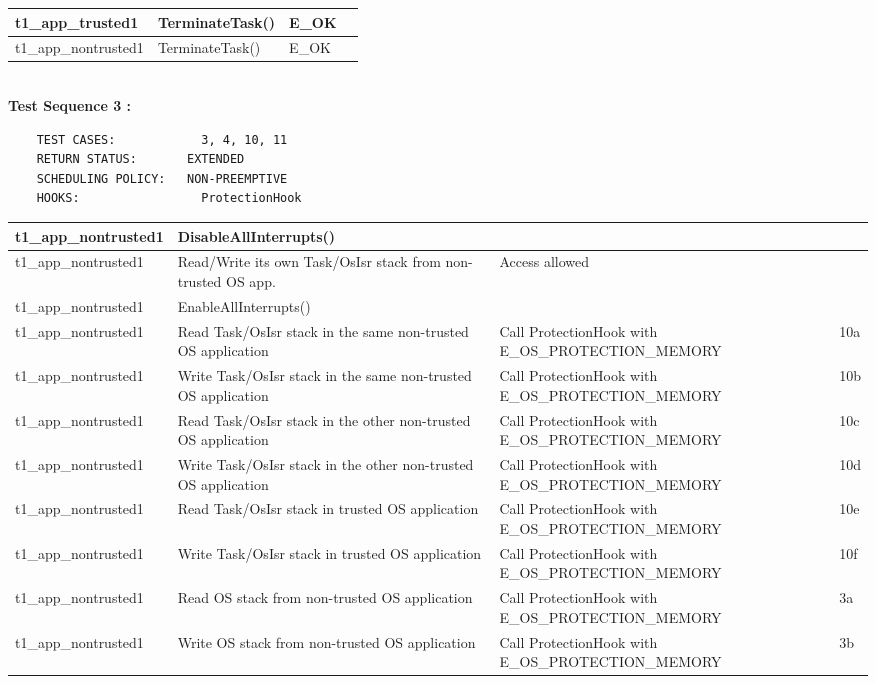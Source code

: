 \documentclass[10pt]{article}
\newlength{\Li}\settowidth{\Li}{Running}
\newlength{\Lii}\setlength{\Lii}{7cm}
\newlength{\Liiii}\setlength{\Liiii}{0.9cm}
\newlength{\Liii}\setlength{\Liii}{\textwidth} \addtolength{\Liii}{-\Li} \addtolength{\Liii}{-\Lii} \addtolength{\Liii}{-\Liiii}
\begin{document}
\begin{supertabular}{|p{\Li}|p{\Lii}|p{\Liii}|p{\Liiii}|}
	t1\_app\_trusted1		& TerminateTask()										& E\_OK											& \\ \hline
	t1\_app\_nontrusted1	& TerminateTask()										& E\_OK											& \\ \hline
	\end{supertabular}\\

	\textbf{Test Sequence 3 :}
	\begin{lstlisting}
	TEST CASES:		       3, 4, 10, 11
	RETURN STATUS:	  	 EXTENDED
	SCHEDULING POLICY:   NON-PREEMPTIVE
	HOOKS:		           ProtectionHook
	\end{lstlisting}
	

	\begin{supertabular}{|p{\Li}|p{\Lii}|p{\Liii}|p{\Liiii}|} \hline 
	t1\_app\_nontrusted1	& DisableAllInterrupts()								&												& \\ \hline
	t1\_app\_nontrusted1	& Read/Write its own Task/OsIsr stack from non-trusted OS app.	& Access allowed								& \\ \hline
	t1\_app\_nontrusted1	& EnableAllInterrupts()								&												& \\ \hline
	
	t1\_app\_nontrusted1	& Read Task/OsIsr stack in the same non-trusted OS application 	& Call ProtectionHook with E\_OS\_PROTECTION\_MEMORY		& 10a \\ \hline
	t1\_app\_nontrusted1	& Write Task/OsIsr stack in the same non-trusted OS application 	& Call ProtectionHook with E\_OS\_PROTECTION\_MEMORY		& 10b \\ \hline
	t1\_app\_nontrusted1	& Read Task/OsIsr stack in the other non-trusted OS application 	& Call ProtectionHook with E\_OS\_PROTECTION\_MEMORY		& 10c \\ \hline
	t1\_app\_nontrusted1	& Write Task/OsIsr stack in the other non-trusted OS application 	& Call ProtectionHook with E\_OS\_PROTECTION\_MEMORY		& 10d \\ \hline
	t1\_app\_nontrusted1	& Read Task/OsIsr stack in trusted OS application			 	& Call ProtectionHook with E\_OS\_PROTECTION\_MEMORY		& 10e \\ \hline
	t1\_app\_nontrusted1	& Write Task/OsIsr stack in trusted OS application			 	& Call ProtectionHook with E\_OS\_PROTECTION\_MEMORY		& 10f \\ \hline
	t1\_app\_nontrusted1	& Read OS stack from non-trusted OS application				& Call ProtectionHook with E\_OS\_PROTECTION\_MEMORY		& 3a \\ \hline
	t1\_app\_nontrusted1	& Write OS stack from non-trusted OS application				& Call ProtectionHook with E\_OS\_PROTECTION\_MEMORY		& 3b \\ \hline
		

\end{supertabular}
\end{document}
